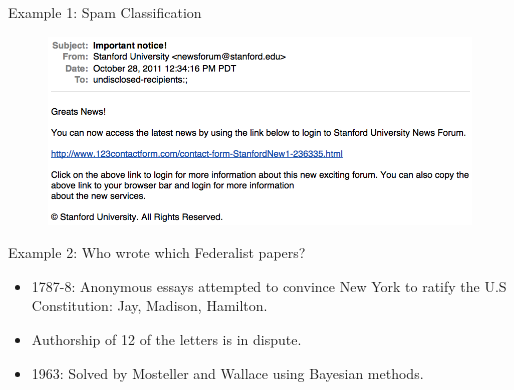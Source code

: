 \documentclass{book}
\begin{document}
Example 1: Spam Classification

\begin{figure}[h]
\includegraphics[scale = 0.35]{pics/spam.png}
\end{figure}


Example 2: Who wrote which Federalist papers?

    \begin{itemize}
        \item 1787-8: Anonymous essays attempted to convince New York to ratify the U.S Constitution: Jay, Madison, Hamilton.
        \item Authorship of 12 of the letters is in dispute.
        \item 1963: Solved by Mosteller and Wallace using Bayesian methods.
    \end{itemize}
\end{document}

